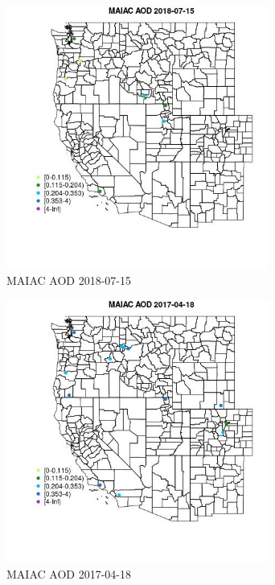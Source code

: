 \begin{figure} 
\centering  
\includegraphics[width=0.77\textwidth]{Code_Outputs/Report_ML_input_PM25_Step4_part_e_de_duplicated_aveswNAs_MapObsMAIAC_AOD2018-07-15.jpg} 
\caption{\label{fig:Report_ML_input_PM25_Step4_part_e_de_duplicated_aveswNAsMapObsMAIAC_AOD2018-07-15}MAIAC AOD 2018-07-15} 
\end{figure} 
 

\begin{figure} 
\centering  
\includegraphics[width=0.77\textwidth]{Code_Outputs/Report_ML_input_PM25_Step4_part_e_de_duplicated_aveswNAs_MapObsMAIAC_AOD2017-04-18.jpg} 
\caption{\label{fig:Report_ML_input_PM25_Step4_part_e_de_duplicated_aveswNAsMapObsMAIAC_AOD2017-04-18}MAIAC AOD 2017-04-18} 
\end{figure} 
 


